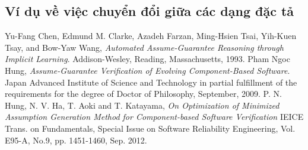 \documentclass[a4paper,13pt,oneside,openany]{book}
\begin{document}
\begin{flushleft}
	\chapter{Ví dụ về việc chuyển đổi giữa các dạng đặc tả}
	\end{flushleft}
\begin{thebibliography}{9}
	Yu-Fang Chen, Edmund M. Clarke, Azadeh Farzan, Ming-Hsien Tsai,
	Yih-Kuen Tsay, and Bow-Yaw Wang, \textit{Automated Assume-Guarantee Reasoning
		through Implicit Learning}. 
	Addison-Wesley, Reading, Massachusetts, 1993.
	Pham Ngoc Hung, \textit{Assume-Guarantee Verification of Evolving Component-Based Software}.
	Japan Advanced Institute of Science and Technology in partial fulfillment of the requirements for the degree of Doctor of Philosophy, September, 2009.
	P. N. Hung, N. V.  Ha, T. Aoki and T. Katayama, \textit{On Optimization of Minimized Assumption Generation Method for Component-based Software Verification}
	IEICE Trans. on Fundamentals, Special Issue on Software Reliability Engineering, Vol. E95-A, No.9, pp. 1451-1460, Sep. 2012.
\end{thebibliography}
\end{document}

